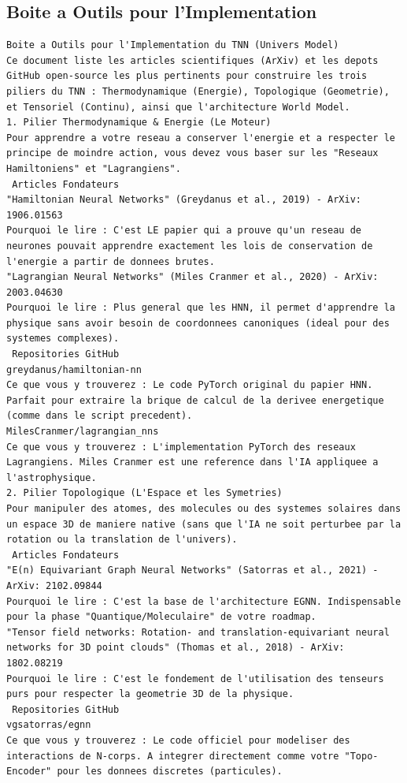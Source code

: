 \documentclass[11pt,a4paper]{article}
\begin{document}
\subsection{ Boite a Outils pour l'Implementation}
\begin{lstlisting}[language={}, caption={}, basicstyle=\ttfamily\footnotesize, breaklines=true]
 Boite a Outils pour l'Implementation du TNN (Univers Model)
Ce document liste les articles scientifiques (ArXiv) et les depots GitHub open-source les plus pertinents pour construire les trois piliers du TNN : Thermodynamique (Energie), Topologique (Geometrie), et Tensoriel (Continu), ainsi que l'architecture World Model.
1. Pilier Thermodynamique & Energie (Le Moteur)
Pour apprendre a votre reseau a conserver l'energie et a respecter le principe de moindre action, vous devez vous baser sur les "Reseaux Hamiltoniens" et "Lagrangiens".
 Articles Fondateurs
"Hamiltonian Neural Networks" (Greydanus et al., 2019) - ArXiv: 1906.01563
Pourquoi le lire : C'est LE papier qui a prouve qu'un reseau de neurones pouvait apprendre exactement les lois de conservation de l'energie a partir de donnees brutes.
"Lagrangian Neural Networks" (Miles Cranmer et al., 2020) - ArXiv: 2003.04630
Pourquoi le lire : Plus general que les HNN, il permet d'apprendre la physique sans avoir besoin de coordonnees canoniques (ideal pour des systemes complexes).
 Repositories GitHub
greydanus/hamiltonian-nn
Ce que vous y trouverez : Le code PyTorch original du papier HNN. Parfait pour extraire la brique de calcul de la derivee energetique (comme dans le script precedent).
MilesCranmer/lagrangian_nns
Ce que vous y trouverez : L'implementation PyTorch des reseaux Lagrangiens. Miles Cranmer est une reference dans l'IA appliquee a l'astrophysique.
2. Pilier Topologique (L'Espace et les Symetries)
Pour manipuler des atomes, des molecules ou des systemes solaires dans un espace 3D de maniere native (sans que l'IA ne soit perturbee par la rotation ou la translation de l'univers).
 Articles Fondateurs
"E(n) Equivariant Graph Neural Networks" (Satorras et al., 2021) - ArXiv: 2102.09844
Pourquoi le lire : C'est la base de l'architecture EGNN. Indispensable pour la phase "Quantique/Moleculaire" de votre roadmap.
"Tensor field networks: Rotation- and translation-equivariant neural networks for 3D point clouds" (Thomas et al., 2018) - ArXiv: 1802.08219
Pourquoi le lire : C'est le fondement de l'utilisation des tenseurs purs pour respecter la geometrie 3D de la physique.
 Repositories GitHub
vgsatorras/egnn
Ce que vous y trouverez : Le code officiel pour modeliser des interactions de N-corps. A integrer directement comme votre "Topo-Encoder" pour les donnees discretes (particules).

\end{lstlisting}
\end{document}
